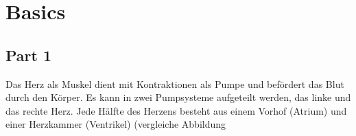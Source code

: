 \chapter{Basics}
\label{sec:Basics}
\section{Part 1}
\label{sec:05_Herz}
Das Herz als Muskel dient mit Kontraktionen als Pumpe und befördert das Blut durch den Körper. Es kann in zwei Pumpsysteme aufgeteilt werden, das linke und das rechte Herz. Jede Hälfte des Herzens besteht aus einem Vorhof (Atrium) und einer Herzkammer (Ventrikel) (vergleiche Abbildung 